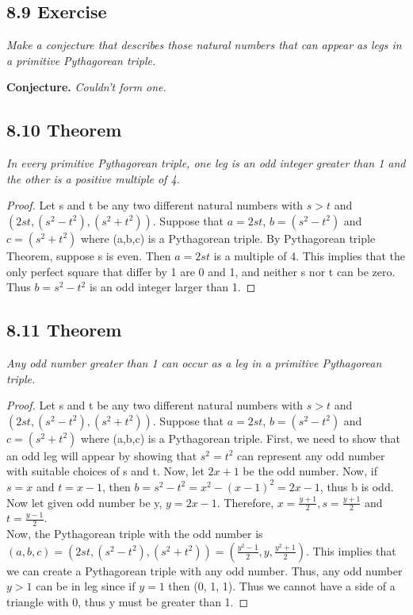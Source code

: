 \documentclass{article}
\begin{document}
\subsection*{8.9 Exercise} 
\quad \textit{Make a conjecture that describes those natural numbers that can appear as legs in a primitive Pythagorean triple.}

\textbf{Conjecture.} \textit{Couldn't form one.}

\subsection*{8.10 Theorem} 
\quad \textit{In every primitive Pythagorean triple, one leg is an odd integer greater than 1 and the other is a positive multiple of 4.}

\begin{proof}
Let s and t be any two different natural numbers with $s > t$ and $(2st,(s^2-t^2),(s^2+t^2))$. Suppose that $a = 2st$, $b = (s^2-t^2)$ and $c = (s^2+t^2)$ where (a,b,c) is a Pythagorean triple. By Pythagorean triple Theorem, suppose s is even. Then $a = 2st$ is a multiple of 4. This implies that the only perfect square that differ by 1 are 0 and 1, and neither s nor t can be zero. Thus $b = s^2 - t^2$ is an odd integer larger than 1. 
\end{proof}

\subsection*{8.11 Theorem} 
\quad \textit{Any odd number greater than 1 can occur as a leg in a primitive Pythagorean triple.}

\begin{proof}
Let s and t be any two different natural numbers with $s > t$ and $(2st,(s^2-t^2),(s^2+t^2))$. Suppose that $a = 2st$, $b = (s^2-t^2)$ and $c = (s^2+t^2)$ where (a,b,c) is a Pythagorean triple. First, we need to show that an odd leg will appear by showing that $s^2 = t^2$ can represent any odd number with suitable choices of s and t. Now, let $2x+1$ be the odd number. Now, if $s = x$ and $t = x -1$, then $b = s^2 - t^2 = x^2 - (x-1)^2 = 2x-1$, thus b is odd. Now let given odd number be y, $y = 2x - 1$. Therefore, $x = \frac{y+1}{2}, s = \frac{y+1}{2}$ and $t = \frac{y-1}{2}$.\\
Now, the Pythagorean triple with the odd number is $(a,b,c) = (2st,(s^2-t^2),(s^2+t^2)) = (\frac{y^2-1}{2}, y, \frac{y^2+1}{2})$. This implies that we can create a Pythagorean triple with any odd number. Thus, any odd number $y  >1$ can be in leg since if $y = 1$ then (0, 1, 1). Thus we cannot have a side of a triangle with 0, thus y must be greater than 1.
\end{proof}
\end{document}

